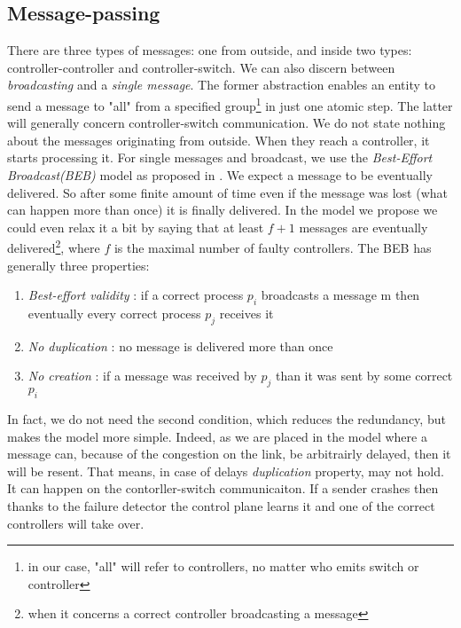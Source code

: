 \documentclass{article}
\begin{document}
\subsection{Message-passing}
There are three types of messages: one from outside, and inside two types: controller-controller and controller-switch. We can also discern between \emph{broadcasting} and a \emph{single message}. The former abstraction enables an entity to send a message to "all" from a specified group\footnote{in our case, "all" will refer to controllers, no matter who emits switch or controller} in just one atomic step. The latter will generally concern controller-switch communication. 
We do not state nothing about the messages originating from outside. When they reach a controller, it starts processing it. For single messages and broadcast, we use the \emph{Best-Effort Broadcast(BEB)} model as proposed in \cite{Guerraoui:2010:IRD:1951643}. We expect a message to be eventually delivered. So after some finite amount of time even if the message was lost (what can happen more than once) it is finally delivered. In the model we propose we could even relax it a bit by saying that at least $f+1$ messages are eventually delivered\footnote{when it concerns a correct controller broadcasting a message}, where $f$ is the maximal number of faulty controllers. 
The BEB has generally three properties:
\begin{enumerate}
\item \emph{Best-effort validity} : if a correct process $p_i$ broadcasts a message m then eventually every correct process $p_j$ receives it
\item \emph{No duplication} : no message is delivered more than once
\item \emph{No creation} : if a message was received by $p_j$ than it was sent by some correct $p_i$
\end{enumerate}
In fact, we do not need the second condition, which reduces the redundancy, but makes the model more simple. Indeed, as we are placed in the model where a message can, because of the congestion on the link, be arbitrairly delayed, then it will be resent. That means, in case of delays \emph{duplication} property, may not hold. It can happen on the contorller-switch communicaiton.
If a sender crashes then thanks to the failure detector the control plane learns it and one of the correct controllers will take over.
\end{document}
